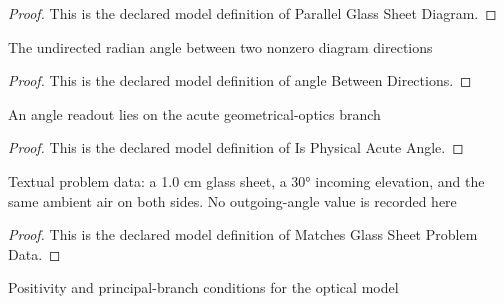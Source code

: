 \begin{proof}
  This is the declared model definition of Parallel Glass Sheet Diagram.
\end{proof}
\begin{definition}
  \label{def:physics:phyx-mini-0049:phyxminiproblems-problemphyxmini0049-anglebetweendirections}
  The undirected radian angle between two nonzero diagram directions
\end{definition}
\begin{proof}
  This is the declared model definition of angle Between Directions.
\end{proof}
\begin{definition}
  \label{def:physics:phyx-mini-0049:phyxminiproblems-problemphyxmini0049-isphysicalacuteangle}
  An angle readout lies on the acute geometrical-optics branch
\end{definition}
\begin{proof}
  This is the declared model definition of Is Physical Acute Angle.
\end{proof}
\begin{definition}
  \label{def:physics:phyx-mini-0049:phyxminiproblems-problemphyxmini0049-matchesglasssheetproblemdata}
  Textual problem data: a 1.0 cm glass sheet, a 30° incoming elevation, and the same ambient air on both sides. No outgoing-angle value is recorded here
\end{definition}
\begin{proof}
  This is the declared model definition of Matches Glass Sheet Problem Data.
\end{proof}
\begin{definition}
  \label{def:physics:phyx-mini-0049:phyxminiproblems-problemphyxmini0049-hasphysicalopticalparameters}
  Positivity and principal-branch conditions for the optical model
\end{definition}
